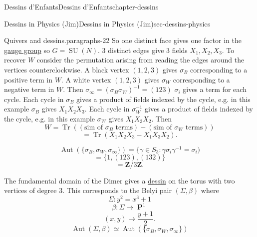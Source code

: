 \documentclass[oneside,10pt,]{book}
\numberwithin{equation}{section}
\newcommand{\inv}{^{-1}}
\newcommand{\ZZ}{\mathbf{Z}}
\DeclareMathOperator{\PP}{\mathbf{P}}
\DeclareMathOperator{\trace}{Tr}
\DeclareMathOperator{\Aut}{Aut}
\DeclareMathOperator{\specialunitary}{SU}
\begin{document}
\begin{chapterptx}{Dessins d'Enfants}{}{Dessins d'Enfants}{}{}{chapter-dessins}
\begin{sectionptx}{Dessins in Physics (Jim)}{}{Dessins in Physics (Jim)}{}{}{sec-dessins-physics}
\begin{paragraphs}{Quivers and dessins.}{paragraphs-22}
So one distinct face gives one factor in the \hyperref[def-gauge-transformations]{gauge group} so \(G = \specialunitary (N)\). 3 distinct edges give 3 fields \(X_1, X_2, X_3\). To recover \(W\) consider the permutation arising from reading the edges around the vertices counterclockwise. A black vertex \((1,2,3)\) gives \(\sigma_B\) corresponding to a positive term in \(W\). A white vertex \((1,2,3)\) gives \(\sigma_W\) corresponding to a negative term in \(W\). Then \(\sigma_\infty = (\sigma_B\sigma_W)\inv = (123)\) \(\sigma_i\) gives a term for each cycle. Each cycle in \(\sigma_B\) gives a product of fields indexed by the cycle, e.g. in this example \(\sigma_B\) gives \(X_1X_2X_3\). Each cycle in \(\sigma_W\inv\) gives a product of fields indexed by the cycle, e.g. in this example \(\sigma_W\) gives \(X_1X_3X_2\). Then%
\begin{equation*}
W = \trace((\text{sim of }\sigma_B\text{ terms}) - (\text{sim of }\sigma_W\text{ terms}))
\end{equation*}
%
\begin{equation*}
= \trace(X_1X_2X_3 - X_1X_3X_2)\text{.}
\end{equation*}
%
\par
\hypertarget{p-778}{}%
%
\begin{equation*}
\Aut( \{\sigma_B,\sigma_W,\sigma_\infty\}) = \{ \gamma\in S_3: \gamma\sigma_i \gamma\inv = \sigma_i)
\end{equation*}
%
\begin{equation*}
= \{1,(123), (132)\}
\end{equation*}
%
\begin{equation*}
= \ZZ/3\ZZ\text{.}
\end{equation*}
%
\par
\hypertarget{p-779}{}%
The fundamental domain of the Dimer gives a \hyperref[def-dessin-denfant]{dessin} on the torus with two vertices of degree 3. This corresponds to the Belyi pair \((\Sigma, \beta)\) where%
\begin{equation*}
\Sigma \colon y^2 = x^3 + 1
\end{equation*}
%
\begin{equation*}
\beta \colon \Sigma  \to \PP^1
\end{equation*}
%
\begin{equation*}
(x,y) \mapsto \frac{y+1}{2}\text{.}
\end{equation*}
%
\begin{equation*}
\Aut(\Sigma, \beta) \simeq \Aut(\{\sigma_B,\sigma_W, \sigma_\infty\})
\end{equation*}

\end{paragraphs}
\end{sectionptx}
\end{chapterptx}
\end{document}

